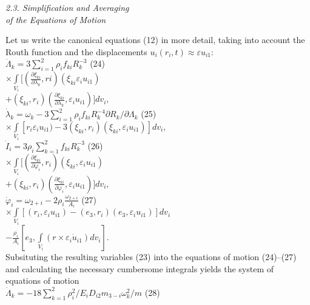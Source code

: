 \documentclass[fontsize = 11pt,a4paper]{article}
\begin{document}
\begin{multicols}{2}
\centerline{\emph{2.3. Simplification and Averaging\\
of the Equations of Motion}}
Let us write the canonical equations (12) in more
detail, taking into account the Routh function and the
displacements $u_i(r_i, t) \approx \varepsilon u_{i1}:$\\
$\dot\Lambda_k = 3  \sum\limits_{i=1}^{2} \rho_i f_{ki} R^{-3}_k$ \hfill (24) \\
$ \times \int\limits_{V_i}[(\frac{\partial{\xi_{ki}}}{\partial{\lambda_k}},ri)(\xi_{ki} \varepsilon_i u_{i1})$\\
$+ (\xi_{ki}, r_i) (\frac{\partial{\xi_{ki}}}{\partial{\lambda_k}}, \varepsilon_i u_{i1})] dv_i,$\\
$\dot\lambda_k  = \omega_k - 3 \sum\limits_{i=1}^{2} \rho_i f_{ki} R^{-4}_k \partial R_k / \partial \Lambda _k$ \hfill (25)\\
$ \times  \int\limits_{V_i} [ r_i \varepsilon_i u_{i1}) - 3(\xi_{ki}, r_i)(\xi_{ki},\varepsilon_i u_{i1})] d v_i,$ \\
$\dot I_i = 3 \rho_i \sum\limits_{k=1}^{2}  f_{ki} R^{-3}_k $ \hfill (26) \\
$ \times  \int\limits_{V_i} [(\frac{\partial{\xi_{ki}}}{\partial{\varphi_i}}, r_i)(\xi_{ki}, \varepsilon_i u_{i1})$ \\
$ + ( \xi_{ki}, r_i) (\frac{\partial{\xi_{ki}}}{\partial{\varphi_i}},  \varepsilon_i u_{i1})]  d v_i,$ \\
$\dot \varphi_i = \omega_{2 + i} - 2 {\rho_i} \frac{\omega_{2 + i}}{A_i}$ \hfill (27) \\
$\times \int\limits_{V_i}[ (r_i,  \varepsilon_i u_{i1}) - (e_3,r_i)(e_3, \varepsilon_i u_{i1})] d v_i$ \\
$- \frac{\rho_i}{A_i}[e_3,\int\limits_{V_i}(r \times \varepsilon_i  \dot u_{i1})d v_i].$\\
Subsituting the resulting variables (23) into the
equations of motion (24)–(27) and calculating the
necessary cumbersome integrals yields the system of
equations of motion\\
$\dot\Lambda_k  = -18 \sum\limits_{k=1}^{2} \rho ^2_i / E_i D_{i2} m_{3-i} \omega^2_k / m$ \hfill (28) \\
\end{multicols}

\thispagestyle{fancy}
\end{document}
